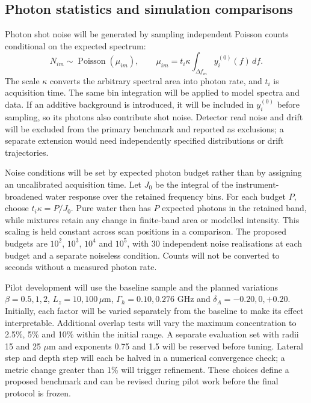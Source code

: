 \documentclass[11pt]{article}
\begin{document}
\subsection{Photon statistics and simulation comparisons}

Photon shot noise will be generated by sampling independent Poisson counts conditional on the expected spectrum:
\begin{equation}
 N_{im}\sim\operatorname{Poisson}(\mu_{im}),\qquad
 \mu_{im}=t_i\kappa\int_{\Delta f_m}y_i^{(0)}(f)\,df.
 \label{eq:noise_model}
\end{equation}
The scale $\kappa$ converts the arbitrary spectral area into photon rate, and $t_i$ is acquisition time. The same bin integration will be applied to model spectra and data. If an additive background is introduced, it will be included in $y_i^{(0)}$ before sampling, so its photons also contribute shot noise. Detector read noise and drift will be excluded from the primary benchmark and reported as exclusions; a separate extension would need independently specified distributions or drift trajectories.

Noise conditions will be set by expected photon budget rather than by assigning an uncalibrated acquisition time. Let $J_0$ be the integral of the instrument-broadened water response over the retained frequency bins. For each budget $P$, choose $t_i\kappa=P/J_0$. Pure water then has $P$ expected photons in the retained band, while mixtures retain any change in finite-band area or modelled intensity. This scaling is held constant across scan positions in a comparison. The proposed budgets are $10^2$, $10^3$, $10^4$ and $10^5$, with 30 independent noise realisations at each budget and a separate noiseless condition. Counts will not be converted to seconds without a measured photon rate.

Pilot development will use the baseline sample and the planned variations $\beta=0.5,1,2$, $L_z=10,100\,\mu\mathrm m$, $\Gamma_h=0.10,0.276$ GHz and $\delta_A=-0.20,0,+0.20$. Initially, each factor will be varied separately from the baseline to make its effect interpretable. Additional overlap tests will vary the maximum concentration to 2.5\%, 5\% and 10\% within the initial range. A separate evaluation set with radii 15 and 25 $\mu\mathrm m$ and exponents 0.75 and 1.5 will be reserved before tuning. Lateral step and depth step will each be halved in a numerical convergence check; a metric change greater than 1\% will trigger refinement. These choices define a proposed benchmark and can be revised during pilot work before the final protocol is frozen.
\end{document}
